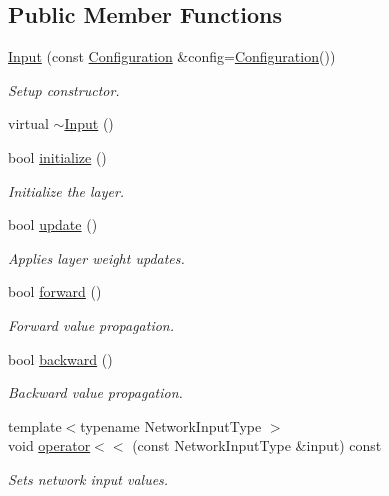 \subsection*{Public Member Functions}
\begin{DoxyCompactItemize}
\item 
\hyperlink{classffnn_1_1layer_1_1_input_accc779dd7c1fd2c93e8ad90cbf3b74ff}{Input} (const \hyperlink{classffnn_1_1layer_1_1_input_ae847a51afe587ae67d9cb1de579d15aa}{Configuration} \&config=\hyperlink{classffnn_1_1layer_1_1_input_ae847a51afe587ae67d9cb1de579d15aa}{Configuration}())
\begin{DoxyCompactList}\small\item\em Setup constructor. \end{DoxyCompactList}\item 
virtual \hyperlink{classffnn_1_1layer_1_1_input_a5ae13ff7d96454d64ade3b248dcb7262}{$\sim$\-Input} ()
\item 
bool \hyperlink{classffnn_1_1layer_1_1_input_afb38d9aee2132342e94f25b12ad64c78}{initialize} ()
\begin{DoxyCompactList}\small\item\em Initialize the layer. \end{DoxyCompactList}\item 
bool \hyperlink{classffnn_1_1layer_1_1_input_a88264632af198c1f704cadace9547932}{update} ()
\begin{DoxyCompactList}\small\item\em Applies layer weight updates. \end{DoxyCompactList}\item 
bool \hyperlink{classffnn_1_1layer_1_1_input_aef1a166edbc2e4fdf8d9403d4aaa38e8}{forward} ()
\begin{DoxyCompactList}\small\item\em Forward value propagation. \end{DoxyCompactList}\item 
bool \hyperlink{classffnn_1_1layer_1_1_input_a6a26cddbed234e1b4f05618d95625db0}{backward} ()
\begin{DoxyCompactList}\small\item\em Backward value propagation. \end{DoxyCompactList}\item 
{\footnotesize template$<$typename Network\-Input\-Type $>$ }\\void \hyperlink{classffnn_1_1layer_1_1_input_a583e22e705bcbabd49165a533511e1cc}{operator$<$$<$} (const Network\-Input\-Type \&input) const 
\begin{DoxyCompactList}\small\item\em Sets network input values. \end{DoxyCompactList}\end{DoxyCompactItemize}


